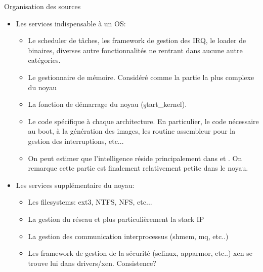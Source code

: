 \begin{frame}[fragile=singleslide]{Organisation des sources}
  \begin{itemize} 
  \item Les services indispensable à un OS:
    \begin{itemize} 
    \item  {}  Le scheduler  de  tâches,  les framework  de
      gestion  des   IRQ,  le  loader  de   binaires,  diverses  autre
      fonctionnalités ne rentrant dans aucune autre catégories.
    \item  {} Le  gestionnaire de  mémoire. Considéré  comme la
      partie la plus complexe du noyau
    \item   {}   La    fonction   de   démarrage   du   noyau
      (\c{start_kernel}).
    \item  {} Le  code spécifique  à chaque  architecture. En
      particulier,  le code nécessaire  au boot,  à la  génération des
      images,   les   routine   assembleur   pour   la   gestion   des
      interruptions, etc...
    \item  On peut  estimer que  l'intelligence  réside principalement
      dans   et .  On remarque cette  partie est
      finalement relativement petite dans le noyau.
    \end{itemize} 
  \item Les services supplémentaire du noyau:
    \begin{itemize}
    \item {} Les filesystems: ext3, NTFS, NFS, etc...
    \item {} La gestion  du réseau et plus particulièrement la
      stack IP
    \item  {}  La  gestion  des  communication  interprocessus
      (shmem, mq, etc..)
    \item  {} Les  framework  de gestion  de la  sécurité
      (selinux, apparmor,  etc..)  \note[item] xen se  trouve lui dans
      drivers/xen. Consistence?
    \end{itemize} 
  \end{itemize}  
\end{frame}
